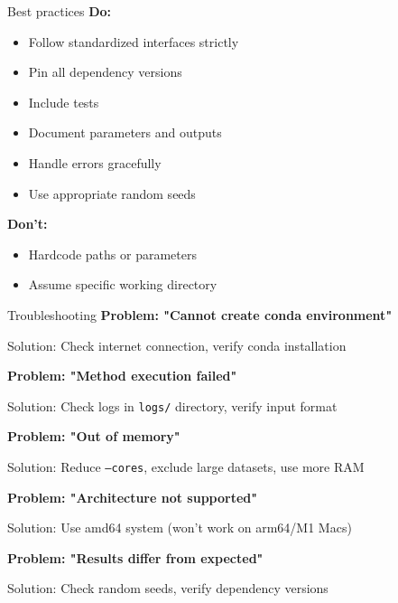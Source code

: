 \documentclass[aspectratio=169]{beamer}
\begin{document}
\begin{frame}{Best practices}
    \textbf{Do:}
    \begin{itemize}
        \item Follow standardized interfaces strictly
        \item Pin all dependency versions
        \item Include tests
        \item Document parameters and outputs
        \item Handle errors gracefully
        \item Use appropriate random seeds
    \end{itemize}
    
    \vspace{0.3cm}
    \textbf{Don't:}
    \begin{itemize}
        \item Hardcode paths or parameters
        \item Assume specific working directory
    \end{itemize}
\end{frame}

\begin{frame}{Troubleshooting}
    \textbf{Problem: "Cannot create conda environment"}
    
    Solution: Check internet connection, verify conda installation
    
    \vspace{0.3cm}
    \textbf{Problem: "Method execution failed"}
    
    Solution: Check logs in \texttt{logs/} directory, verify input format
    
    \vspace{0.3cm}
    \textbf{Problem: "Out of memory"}
    
    Solution: Reduce \texttt{--cores}, exclude large datasets, use more RAM
    
    \vspace{0.3cm}
    \textbf{Problem: "Architecture not supported"}
    
    Solution: Use amd64 system (won't work on arm64/M1 Macs)
    
    \vspace{0.3cm}
    \textbf{Problem: "Results differ from expected"}
    
    Solution: Check random seeds, verify dependency versions
\end{frame}
\end{document}
